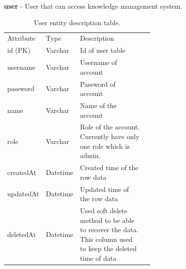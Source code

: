 \documentclass[12pt,oneside,openright,a4paper]{cpe-english-project}
\begin{document}
\pagebreak

\textbf{user} - User that can access knowledge management system.

\begin{table}[ht]
	\caption{User entity description table.}
	\label{tab:User entity description table}
\begin{adjustbox}{width=\textwidth}
\begin{tabular}{llp{0.6\linewidth}l}
\rowcolor[HTML]{5B9BD5} 
Attribute & Type     & Description                                                                                                   \\
\rowcolor[HTML]{DEEAF6} 
id (PK)   & Varchar  & Id of user table                                                                                              \\
username  & Varchar  & Username of account                                                                                           \\
\rowcolor[HTML]{DEEAF6} 
password  & Varchar  & Password of account                                                                                           \\
name      & Varchar  & Name of the account                                                                                           \\
\rowcolor[HTML]{DEEAF6} 
role      & Varchar  & Role of the account. Currently have only one role which is admin.                                             \\
createdAt & Datetime & Created time of the row   data                                                                                \\
\rowcolor[HTML]{DEEAF6} 
updatedAt & Datetime & Updated time of the row data                                                                                  \\
deletedAt & Datetime & Used soft delete method   to be able to recover the data. This column used to keep the deleted time of   data
\end{tabular}
\end{adjustbox}
\end{table}
\end{document}
